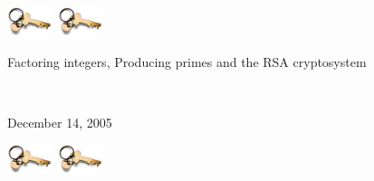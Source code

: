 \documentclass[landscape]{powersem} %
\begin{document}

\begin{slide}\pagestyle{empty}
\addtocounter{slide}{-1}
\includegraphics[width=1.3cm]{images/crypto.jpg}\ \hfill \includegraphics[width=1.3cm]{images/crypto.jpg}
\vfil

\begin{sc}\begin{center}
\begin{Large}


\textcolor{underlcolor}{Factoring integers, Producing primes and the RSA cryptosystem}
\end{Large}
\bigskip\bigskip

\\
\bigskip

December 14, 2005
\end{center}
\end{sc}
\vfill

\includegraphics[width=1.3cm]{images/crypto.jpg}\ \hfill \includegraphics[width=1.3cm]{images/crypto.jpg}
\end{slide}
\end{document}

